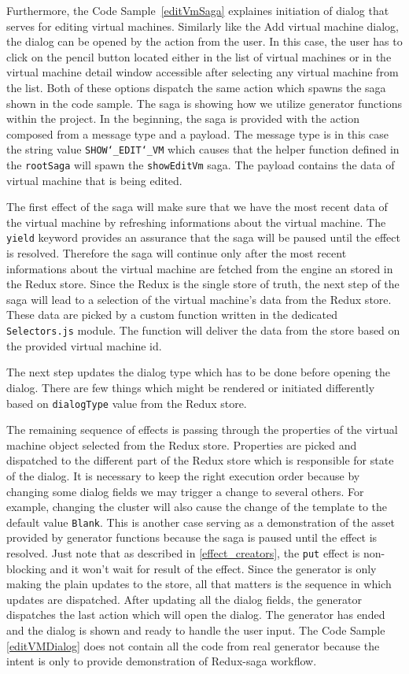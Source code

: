 Furthermore, the Code Sample~\ref{editVmSaga} explaines initiation of dialog that serves for editing virtual machines. Similarly like the Add virtual machine dialog, the dialog can be opened by the action from the user. In this case, the user has to click on the pencil button located either in the list of virtual machines or in the virtual machine detail window accessible after selecting any virtual machine from the list. Both of these options dispatch the same action which spawns the saga shown in the code sample. The saga is showing how we utilize generator functions within the project. In the beginning, the saga is provided with the action composed from a message type and a payload. The message type is in this case the string value \texttt{SHOW\char`_EDIT\char`_VM} which causes that the helper function defined in the \texttt{rootSaga} will spawn the \texttt{showEditVm} saga. The payload contains the data of virtual machine that is being edited.

The first effect of the saga will make sure that we have the most recent data of the virtual machine by refreshing informations about the virtual machine. The \texttt{yield} keyword provides an assurance that the saga will be paused until the effect is resolved. Therefore the saga will continue only after the most recent informations about the virtual machine are fetched from the engine an stored in the Redux store. Since the Redux is the single store of truth, the next step of the saga will lead to a selection of the virtual machine's data from the Redux store. These data are picked by a custom function written in the dedicated \texttt{Selectors.js} module. The function will deliver the data from the store based on the provided virtual machine id.

The next step updates the dialog type which has to be done before opening the dialog. There are few things which might be rendered or initiated differently based on \texttt{dialogType} value from the Redux store.

The remaining sequence of effects is passing through the properties of the virtual machine object selected from the Redux store. Properties are picked and dispatched to the different part of the Redux store which is responsible for state of the dialog. It is necessary to keep the right execution order because by changing some dialog fields we may trigger a change to several others. For example, changing the cluster will also cause the change of the template to the default value \texttt{Blank}. This is another case serving as a demonstration of the asset provided by generator functions because the saga is paused until the effect is resolved. Just note that as described in \ref{effect_creators}, the \texttt{put} effect is non-blocking and it won't wait for result of the effect. Since the generator is only making the plain updates to the store, all that matters is the sequence in which updates are dispatched. After updating all the dialog fields, the generator dispatches the last action which will open the dialog. The generator has ended and the dialog is shown and ready to handle the user input. The Code Sample \ref{editVMDialog} does not contain all the code from real generator because the intent is only to provide demonstration of Redux-saga workflow.

